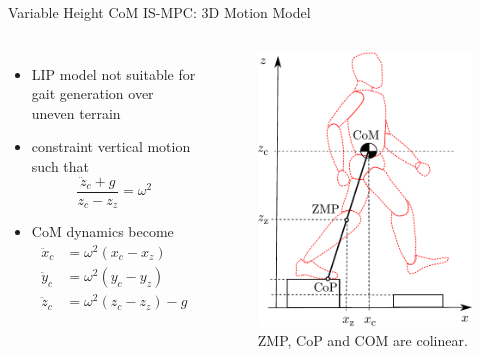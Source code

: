 \documentclass[10pt]{beamer}
\begin{document}
\begin{frame}{Variable Height CoM IS-MPC: 3D Motion Model}
  \begin{columns}[c,onlytextwidth]
      \begin{itemize}
        \item LIP model not suitable for gait generation over uneven terrain
				\item constraint vertical motion such that
			    \begin{equation*}
            \frac{\ddot{z}_c + g}{z_c - z_z} = \omega^2
          \end{equation*}
				\item CoM dynamics become
				  \begin{align*}
					  \ddot{x}_c &= \omega^2 (x_c - x_z)\\
					  \ddot{y}_c &= \omega^2 (y_c - y_z)\\
					  \ddot{z}_c &= \omega^2 (z_c - z_z) - g
				  \end{align*}
			\end{itemize}
		  \begin{figure}
        \centering
        \includegraphics[width=\textwidth]{figures/LIPM_robot.pdf}
        \caption{ZMP, CoP and COM are colinear.}
        \label{fig:lipm-robot}
    \end{figure}
	\end{columns}
\end{frame}
\end{document}
